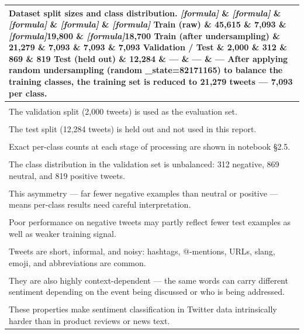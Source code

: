 \documentclass[11pt]{article}
\begin{document}
\begin{longtable}{|p{\dimexpr\linewidth-2\tabcolsep-2\arrayrulewidth\relax}|}
\hline
Dataset split sizes and class distribution. \textit{[formula]} \& \textit{[formula]} \& \textit{[formula]} \& \textit{[formula]} \& \textit{[formula]} Train (raw) \& 45,615 \& 7,093 \& \textit{[formula]}19,800 \& \textit{[formula]}18,700 Train (after undersampling) \& 21,279 \& 7,093 \& 7,093 \& 7,093 Validation / Test \& 2,000 \& 312 \& 869 \& 819 Test (held out) \& 12,284 \& --- \& --- \& --- After applying random undersampling (random \_state=82171165) to balance the training classes, the training set is reduced to 21,279 tweets --- 7,093 per class. \\[2pt]
\hline
\rule{0pt}{3.5cm} \\
\hline
The validation split (2,000 tweets) is used as the evaluation set. \\[2pt]
\hline
\rule{0pt}{3.5cm} \\
\hline
The test split (12,284 tweets) is held out and not used in this report. \\[2pt]
\hline
\rule{0pt}{3.5cm} \\
\hline
Exact per-class counts at each stage of processing are shown in notebook §2.5. \\[2pt]
\hline
\rule{0pt}{3.5cm} \\
\hline
The class distribution in the validation set is unbalanced: 312 negative, 869 neutral, and 819 positive tweets. \\[2pt]
\hline
\rule{0pt}{3.5cm} \\
\hline
This asymmetry --- far fewer negative examples than neutral or positive --- means per-class results need careful interpretation. \\[2pt]
\hline
\rule{0pt}{3.5cm} \\
\hline
Poor performance on negative tweets may partly reflect fewer test examples as well as weaker training signal. \\[2pt]
\hline
\rule{0pt}{3.5cm} \\
\hline
Tweets are short, informal, and noisy: hashtags, @-mentions, URLs, slang, emoji, and abbreviations are common. \\[2pt]
\hline
\rule{0pt}{3.5cm} \\
\hline
They are also highly context-dependent --- the same words can carry different sentiment depending on the event being discussed or who is being addressed. \\[2pt]
\hline
\rule{0pt}{3.5cm} \\
\hline
These properties make sentiment classification in Twitter data intrinsically harder than in product reviews or news text. \\[2pt]

\end{longtable}
\end{document}
